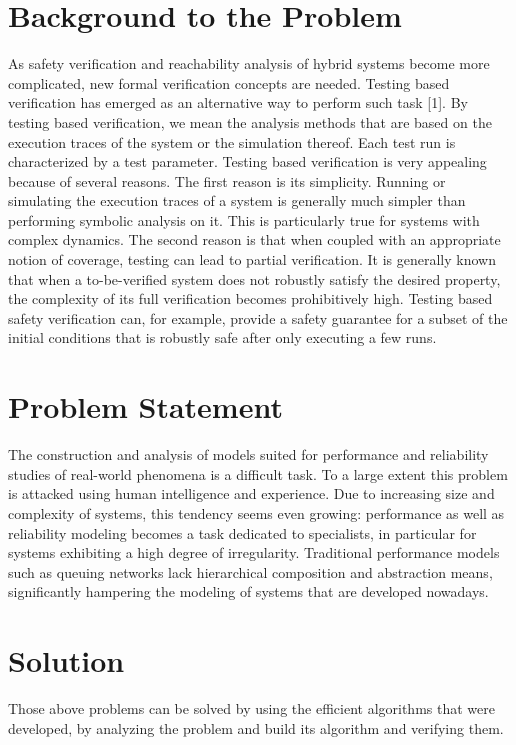 \documentclass[14pt]{article}
\begin{document}
\section{Background to the Problem}
As safety verification and reachability analysis of hybrid systems become more complicated, new formal verification concepts are needed. Testing based verification has emerged as an alternative way to perform such task [1]. By testing based verification, we mean the analysis methods that are based on the execution traces of the system or the simulation thereof. Each test run is characterized by a test parameter.
Testing based verification is very appealing because of several reasons. The first reason is its simplicity. Running or simulating the execution traces of a system is generally much simpler than performing symbolic analysis on it. This is particularly true for systems with complex dynamics. The second reason is that when coupled with an appropriate notion of coverage, testing can lead to partial verification. It is generally known that when a to-be-verified system does not robustly satisfy the desired property, the complexity of its full verification becomes prohibitively high. Testing based safety verification can, for example, provide a safety guarantee for a subset of the initial conditions that is robustly safe after only executing a few runs.

\section{Problem Statement}
The construction and analysis of models suited for performance and reliability studies
of real-world phenomena is a difficult task. To a large extent this problem is attacked using
human intelligence and experience. Due to increasing size and complexity of systems, this
tendency seems even growing: performance as well as reliability modeling becomes a task
dedicated to specialists, in particular for systems exhibiting a high degree of irregularity.
Traditional performance models such as queuing networks lack hierarchical composition
and abstraction means, significantly hampering the modeling of systems that are developed nowadays.

\section{Solution}
Those above problems can be solved by using the efficient algorithms that were developed, by analyzing the problem and build its algorithm and verifying them.
\end{document}
